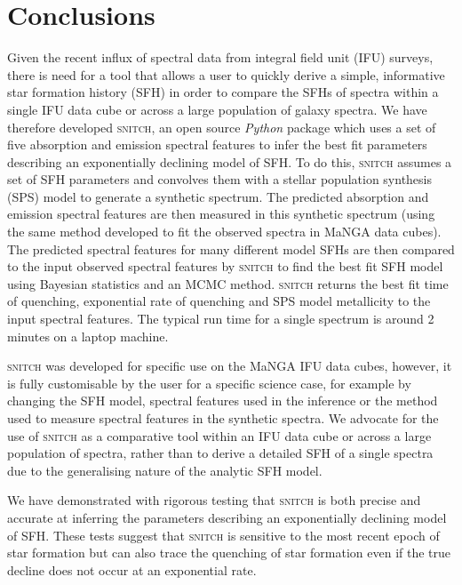 \documentclass[useAMS,usenatbib]{mn2e}
\begin{document}
\section{Conclusions}

Given the recent influx of spectral data from integral field unit (IFU) surveys, there is need for a tool that allows a user to quickly derive a simple, informative star formation history (SFH) in order to compare the SFHs of spectra within a single IFU data cube or across a large population of galaxy spectra. We have therefore developed \textsc{snitch}, an open source \emph{Python} package which uses a set of five absorption and emission spectral features to infer the best fit parameters describing an exponentially declining model of SFH. To do this, \textsc{snitch} assumes a set of SFH parameters and convolves them with a stellar population synthesis (SPS) model to generate a synthetic spectrum. The predicted absorption and emission spectral features are then measured in this synthetic spectrum (using the same method developed to fit the observed spectra in MaNGA data cubes). The predicted spectral features for many different model SFHs are then compared to the input observed spectral features by \textsc{snitch} to find the best fit SFH model using Bayesian statistics and an MCMC method. \textsc{snitch} returns the best fit time of quenching, exponential rate of quenching and SPS model metallicity to the input spectral features. The typical run time for a single spectrum is around 2 minutes on a laptop machine. 

\textsc{snitch} was developed for specific use on the MaNGA IFU data cubes, however, it is fully customisable by the user for a specific science case, for example by changing the SFH model, spectral features used in the inference or the method used to measure spectral features in the synthetic spectra. We advocate for the use of \textsc{snitch} as a comparative tool within an IFU data cube or across a large population of spectra, rather than to derive a detailed SFH of a single spectra due to the generalising nature of the analytic SFH model.

We have demonstrated with rigorous testing that \textsc{snitch} is both precise and accurate at inferring the parameters describing an exponentially declining model of SFH. These tests suggest that \textsc{snitch} is sensitive to the most recent epoch of star formation but can also trace the quenching of star formation even if the true decline does not occur at an exponential rate.  
\end{document}
